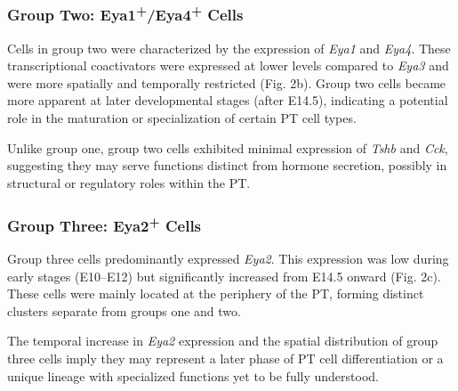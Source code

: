 \documentclass[
  number,
  preprint]{elsarticle}
\begin{document}
\subsubsection{\texorpdfstring{\textbf{Group Two:
Eya1\textsuperscript{+}/Eya4\textsuperscript{+}
Cells}}{Group Two: Eya1+/Eya4+ Cells}}\label{group-two-eya1eya4-cells}

Cells in group two were characterized by the expression of \emph{Eya1}
and \emph{Eya4}. These transcriptional coactivators were expressed at
lower levels compared to \emph{Eya3} and were more spatially and
temporally restricted (Fig. 2b). Group two cells became more apparent at
later developmental stages (after E14.5), indicating a potential role in
the maturation or specialization of certain PT cell types.

Unlike group one, group two cells exhibited minimal expression of
\emph{Tshb} and \emph{Cck}, suggesting they may serve functions distinct
from hormone secretion, possibly in structural or regulatory roles
within the PT.

\subsubsection{\texorpdfstring{\textbf{Group Three:
Eya2\textsuperscript{+}
Cells}}{Group Three: Eya2+ Cells}}\label{group-three-eya2-cells}

Group three cells predominantly expressed \emph{Eya2}. This expression
was low during early stages (E10--E12) but significantly increased from
E14.5 onward (Fig. 2c). These cells were mainly located at the periphery
of the PT, forming distinct clusters separate from groups one and two.

The temporal increase in \emph{Eya2} expression and the spatial
distribution of group three cells imply they may represent a later phase
of PT cell differentiation or a unique lineage with specialized
functions yet to be fully understood.
\end{document}
